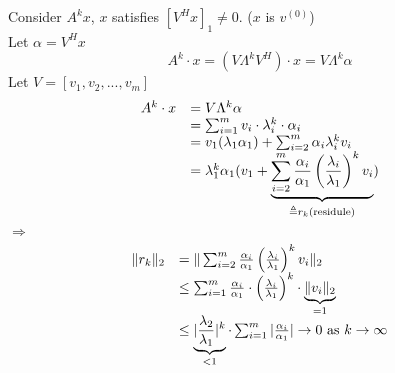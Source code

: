 \begin{multicols}{2}
Consider $A^kx$, $x$ satisfies $[V^Hx]_1\neq 0$. ($x$ is $v^{(0)}$)\\
Let $\alpha = V^Hx$ \\
\[
    A^k\cdot x = (V\Lambda^kV^H)\cdot x = V\Lambda^k \alpha 
\]
Let $V=[v_1,v_2,...,v_m]$
\[
    \begin{array}{ll}
        A^k\cdot x  &= V\Lambda^k \alpha \\
                    &= \sum_{i=1}^mv_i\cdot \lambda_i^k \cdot \alpha_i \\
                    &= v_1(\lambda_1\alpha_1) + \sum_{i=2}^m\alpha_i\lambda_i^kv_i \\
                    &= \lambda_1^k\alpha_1 (v_1+\underbrace{\sum_{i=2}^m \frac{\alpha_i}{\alpha_1} \left(\frac{\lambda_i}{\lambda_1}\right) ^kv_i}_{\triangleq r_k(\textbf{\rm residule})})
    \end{array}
\]
$\Longrightarrow$
\[
    \begin{array}{ll}
        \|r_k\|_2   &=      \|\sum_{i=2}^m \frac{\alpha_i}{\alpha_1} \left(\frac{\lambda_i}{\lambda_1}\right) ^kv_i\|_2 \\
                    &\leq   \sum_{i=1}^m \frac{\alpha_i}{\alpha_1} \cdot \left(\frac{\lambda_i}{\lambda_1}\right) ^k \cdot \underbrace{\|v_i\|_2}_{=1} \\
                    &\leq   \underbrace{|\frac{\lambda_2}{\lambda_1}|^k}_{<1}\cdot \sum_{i=1}^m |\frac{\alpha_i}{\alpha_1}| \to 0 \text{ \rm as } k\to \infty


\end{array}\]
\end{multicols}

